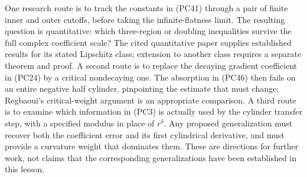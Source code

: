 \documentclass[
  11pt,
]{article}
\begin{document}
One research route is to track the constants in (PC41) through a pair of
finite inner and outer cutoffs, before taking the infinite-flatness
limit. The resulting question is quantitative: which three-region or
doubling inequalities survive the full complex coefficient scale? The
cited quantitative paper supplies established results for its stated
Lipschitz class; extension to another class requires a separate theorem
and proof. A second route is to replace the decaying gradient
coefficient in (PC24) by a critical nondecaying one. The absorption in
(PC46) then fails on an entire negative half cylinder, pinpointing the
estimate that must change; Regbaoui's critical-weight argument is an
appropriate comparison. A third route is to examine which information in
(PC3) is actually used by the cylinder transfer step, with a specified
modulus in place of \(r^\delta\). Any proposed generalization must
recover both the coefficient error and its first cylindrical derivative,
and must provide a curvature weight that dominates them. These are
directions for further work, not claims that the corresponding
generalizations have been established in this lesson.
\end{document}
